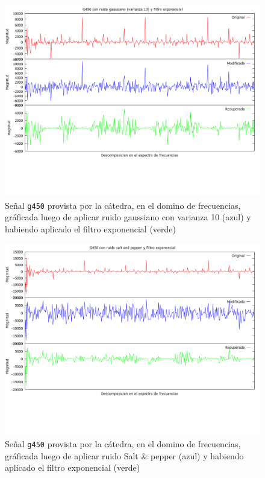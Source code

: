 \begin{figure}[H]
\begin {center}
\includegraphics[width=500pt]{imagenes/g450-gauss-10-exp.png}
\end {center}
\caption{Se\~nal \texttt{g450} provista por la c\'atedra, en el domino de frecuencias, gr\'aficada
luego de aplicar ruido gaussiano con varianza 10 (azul) y 
habiendo aplicado el filtro exponencial (verde)}
\label{fig:expGauss10}
\end{figure}

\begin{figure}[H]
\begin {center}
\includegraphics[width=500pt]{imagenes/g450-imp-exp.png}
\end {center}
\caption{Se\~nal \texttt{g450} provista por la c\'atedra, en el domino de frecuencias, gr\'aficada
luego de aplicar ruido Salt \& pepper (azul) y habiendo aplicado el filtro exponencial (verde)}
\label{fig:expImp}
\end{figure}

